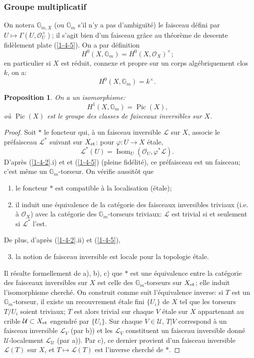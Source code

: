 \documentclass{article}
\DeclareMathOperator{\pic}{Pic}
\newcommand{\et}[1]{{#1}_{\textnormal{et}}}
\newcommand{\cL}{\mathcal{L}}
\newcommand{\cO}{\mathcal{O}}
\newcommand{\cU}{\mathcal{U}}
\newcommand{\dG}{\mathbb{G}}
\newtheorem{proposition}[subsubsection]{Proposition}
\begin{document}
\subsubsection{Groupe multiplicatif}\label{2-2-2}

On notera $\dG_{m,X}$ (ou $\dG_m$ s'il n'y a pas d'ambiguïté) le faisceau 
défini par $U\mapsto \Gamma(U,\cO_U^\times)$; il s'agit bien d'un faisceau 
grâce au théorème de descente fidèlement plate (\ref{1-4-5}). On a 
par définition 
\[
  H^0(X,\dG_m) = H^0(X,\cO_X)^\times\text{;}
\]
en particulier si $X$ est réduit, connexe et propre sur un corps 
algébriquement clos $k$, on a:
\[
  H^0(X,\dG_m) = k^\times\text{.}
\]

\begin{proposition}\label{2-2-3}
On a un isomorphisme:
\[
  H^1(X,\dG_m) = \pic(X)\text{,}
\]
où $\pic(X)$ est le groupe des classes de faisceaux inversibles sur $X$.
\end{proposition}
\begin{proof}
Soit $*$ le foncteur qui, à un faisceau inversible $\cL$ sur $X$, associe le 
préfaisceau $\cL^*$ suivant sur $\et X$: pour $\varphi:U\to X$ étale, 
\[
  \cL^*(U)=\operatorname{Isom}_U(\cO_U,\varphi^*\cL)\text{.}
\]
D'après (\ref{1-4-2}.i) et et (\ref{1-4-5}) (pleine fidélité), ce 
préfaisceau est un faisceau; c'est même un $\dG_m$-torseur. On vérifie 
aussitôt que 
\begin{enumerate}[\indent a)]
  \item le foncteur $*$ est compatible à la localisation (étale);
  \item il induit une équivalence de la catégorie des faisceaux 
    inversibles triviaux (i.e. à $\cO_X$) avec la catégorie des 
    $\dG_m$-torseurs triviaux: $\cL$ est trivial si et seulement si $\cL^*$ 
    l'est.
\end{enumerate}

De plus, d'après (\ref{1-4-2}.ii) et (\ref{1-4-5}), 
\begin{enumerate}[\indent a)]
\setcounter{enumi}{2}
  \item la notion de faisceau inversible est locale pour la topologie étale. 
\end{enumerate}

Il résulte formellement de a), b), c) que $*$ est une équivalence entre la 
catégorie des faisceaux inversibles sur $X$ est celle des $\dG_m$-torseurs 
sur $\et X$; elle induit l'isomorphisme cherché. On construit comme suit 
l'équivalence inverse: si $T$ est un $\dG_m$-torseur, il existe un 
recouvrement étale fini $\{U_i\}$ de $X$ tel que les torseurs $T/U_i$ soient 
triviaux; $T$ est alors trivial sur chaque $V$ étale sur $X$ appartenant au 
crible $\cU\subset \et X$ engendré par $\{U_i\}$. Sur chaque 
$V\in\cU$, $T|V$ correspond à un faisceau inversible $\cL_V$ (par b)) et les 
$\cL_V$ constituent un faisceau inversible donné $\cU$-localement $\cL_\cU$ 
(par a)). Par c), ce dernier provient d'un faisceau inversible $\cL(T)$ sur 
$X$, et $T\mapsto \cL(T)$ est l'inverse cherché de $*$. 
\end{proof}
\end{document}
